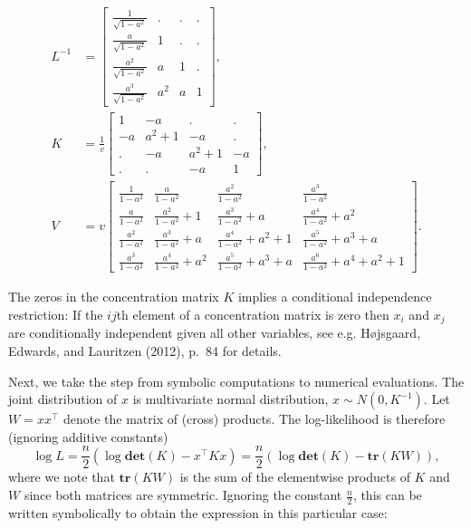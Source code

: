 \begin{align} 
    L^{-1} &= \left[\begin{matrix}\frac{1}{\sqrt{1 - a^{2}}} & . & . & .\\\frac{a}{\sqrt{1 - a^{2}}} & 1 & . & .\\\frac{a^{2}}{\sqrt{1 - a^{2}}} & a & 1 & .\\\frac{a^{3}}{\sqrt{1 - a^{2}}} & a^{2} & a & 1\end{matrix}\right] , \\ 
    K &= \frac{1}{v}  \left[\begin{matrix}1 & - a & . & .\\- a & a^{2} + 1 & - a & .\\. & - a & a^{2} + 1 & - a\\. & . & - a & 1\end{matrix}\right] , \\ 
    V &= v  \left[\begin{matrix}\frac{1}{1 - a^{2}} & \frac{a}{1 - a^{2}} & \frac{a^{2}}{1 - a^{2}} & \frac{a^{3}}{1 - a^{2}}\\\frac{a}{1 - a^{2}} & \frac{a^{2}}{1 - a^{2}} + 1 & \frac{a^{3}}{1 - a^{2}} + a & \frac{a^{4}}{1 - a^{2}} + a^{2}\\\frac{a^{2}}{1 - a^{2}} & \frac{a^{3}}{1 - a^{2}} + a & \frac{a^{4}}{1 - a^{2}} + a^{2} + 1 & \frac{a^{5}}{1 - a^{2}} + a^{3} + a\\\frac{a^{3}}{1 - a^{2}} & \frac{a^{4}}{1 - a^{2}} + a^{2} & \frac{a^{5}}{1 - a^{2}} + a^{3} + a & \frac{a^{6}}{1 - a^{2}} + a^{4} + a^{2} + 1\end{matrix}\right]  .
  \end{align}

The zeros in the concentration matrix \(K\) implies a conditional
independence restriction: If the \(ij\)th element of a concentration
matrix is zero then \(x_i\) and \(x_j\) are conditionally independent
given all other variables, see e.g. Højsgaard, Edwards, and Lauritzen (2012), p.~84 for
details.

Next, we take the step from symbolic computations to numerical
evaluations. The joint distribution of \(x\) is multivariate normal
distribution, \(x\sim N(0, K^{-1})\). Let \(W=x x^\top\) denote the
matrix of (cross) products. The log-likelihood is therefore (ignoring
additive constants)
\[ 
\log L = \frac n 2 (\log \mathbf{det}(K) - x^\top K x) = \frac n 2 (\log \mathbf{det}(K) - \mathbf{tr}(K W)), 
\]
where we note that \(\mathbf{tr}(KW)\) is the
sum of the elementwise products of \(K\) and \(W\) since both matrices are
symmetric. Ignoring the constant \(\frac n 2\),
this can be written symbolically to obtain the expression in
this particular case:

